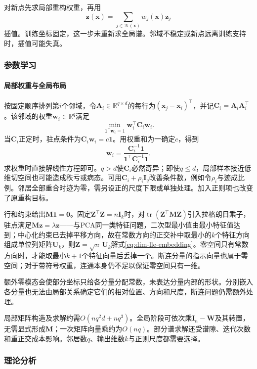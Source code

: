 对新点先求局部重构权重，再用
\[
  \bm{z}(\bm{x})=\sum_{j\in\mathcal{N}(\bm{x})}w_j(\bm{x})\bm{z}_j
\]
插值。训练坐标固定，这一步未重新求全局谱。邻域不稳定或新点远离训练支持时，插值可能失真。

\subsubsection{参数学习}

\paragraph{局部权重与全局布局}

按固定顺序排列第$i$个邻域，令$\bm{A}_i\in\mathbb{R}^{q\times d}$的每行为$(\bm{x}_j-\bm{x}_i)^{\top}$，并记$\bm{C}_i=\bm{A}_i\bm{A}_i^{\top}$。该邻域的权重$\bm{w}_i\in\mathbb{R}^q$满足
\[
  \min_{\bm{1}^{\top}\bm{w}_i=1}
    \bm{w}_i^{\top}\bm{C}_i\bm{w}_i.
\]
当$\bm{C}_i$正定时，驻点条件为$\bm{C}_i\bm{w}_i=c\bm{1}$。用权重和为一确定$c$，得到
\begin{equation}
  \label{eq:dim-lle-local}
  \bm{w}_i
  =\frac{\bm{C}_i^{-1}\bm{1}}
         {\bm{1}^{\top}\bm{C}_i^{-1}\bm{1}}.
\end{equation}
求权重时直接解线性方程即可。$q>d$使$\bm{C}_i$必然奇异；即使$q\leq d$，局部样本接近低维切空间也可能造成秩亏或病态。可用$\bm{C}_i+\rho_i\bm{I}_q$改善条件数，例如令$\rho_i$与迹成比例。邻居全部重合时迹为零，需另设正的尺度下限或单独处理。加入正则项也改变了原重构目标。

行和约束给出$\bm{M}\bm{1}=\bm{0}$。固定$\bm{Z}^{\top}\bm{Z}=n\bm{I}_k$时，对$\operatorname{tr}(\bm{Z}^{\top}\bm{M}\bm{Z})$引入拉格朗日乘子，驻点满足$\bm{M}\bm{z}=\lambda\bm{z}$——与PCA同一类特征问题，二次型最小值由最小特征值达到；中心化约束已去掉平移方向，故在常数方向的正交补中取最小的$k$个特征方向组成单位列矩阵$\bm{U}_k$，则$\bm{Z}=\sqrt n\,\bm{U}_k$解式\eqref{eq:dim-lle-embedding}。零空间只有常数方向时，才能取最小$k+1$个特征向量后丢掉一个。断连分量的指示向量也属于零空间；对于带符号权重，连通本身仍不足以保证零空间只有一维。

额外零模态会使部分坐标只给各分量分配常数，未表达分量内部的形状。分别嵌入各分量也无法由局部关系确定它们的相对位置、方向和尺度，断连问题仍需额外处理。

局部矩阵构造及求解约需$O(nq^2d+nq^3)$。全局阶段可依次乘$\bm{I}_n-\bm{W}$及其转置，无需显式形成$\bm{M}$；一次矩阵向量乘约为$O(nq)$。部分谱求解还受谱隙、迭代次数和重正交成本影响。邻居数$q$、输出维数$k$与正则尺度都需要选择。

\subsubsection{理论分析}

